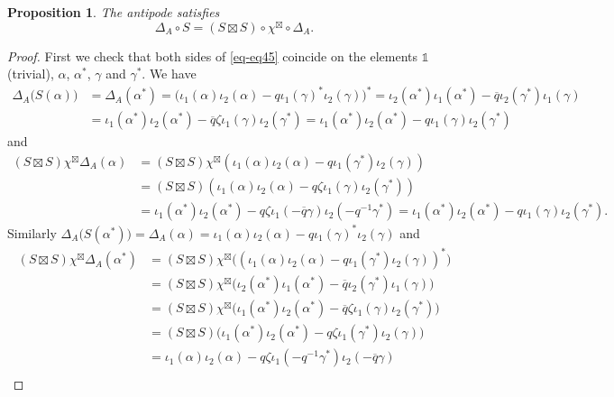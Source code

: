 \documentclass[12pt,reqno,a4paper]{amsart}
\newtheorem{proposition}{Proposition}[section]
\theoremstyle{definition}
\newcommand{\comp}{\circ}
\newcommand{\I}{\mathds{1}}
\numberwithin{equation}{section}
\begin{document}
\begin{proposition}\label{prop-lemma12}
The antipode satisfies
\begin{equation}\label{eq-eq45}
\Delta_A\comp S=(S\boxtimes S)\comp\chi^{\boxtimes}\comp\Delta_A.
\end{equation}
\end{proposition}

\begin{proof}
First we check that both sides of \eqref{eq-eq45} coincide on the elements $\I$ (trivial), $\alpha$, $\alpha^*$, $\gamma$ and $\gamma^*$. We have
\begin{align*}
\Delta_A\bigl(S(\alpha)\bigr)
&=\Delta_A(\alpha^*)
=\bigl(\iota_1(\alpha)\iota_2(\alpha)-q\iota_1(\gamma)^* \iota_2(\gamma)\bigr)^*
=\iota_2(\alpha^*)\iota_1(\alpha^*)-\overline{q}\iota_2(\gamma^*)\iota_1(\gamma)\\
&=\iota_1(\alpha^*)\iota_2(\alpha^*)-\overline{q}\zeta\iota_1(\gamma)\iota_2(\gamma^*)
=\iota_1(\alpha^*)\iota_2(\alpha^*)-q\iota_1(\gamma)\iota_2(\gamma^*)
\end{align*}
and
\begin{align*}
(S\boxtimes S)\chi^{\boxtimes}\Delta_A(\alpha)
&=(S\boxtimes S)\chi^{\boxtimes}(\iota_1(\alpha)\iota_2(\alpha)-q\iota_1(\gamma^*)\iota_2(\gamma))\\
&=(S\boxtimes S)(\iota_1(\alpha)\iota_2(\alpha)-q\zeta\iota_1(\gamma)\iota_2(\gamma^*))\\
&=\iota_1(\alpha^*)\iota_2(\alpha^*)-q\zeta\iota_1(-\overline{q}\gamma)\iota_2(-q^{-1}\gamma^*)
=\iota_1(\alpha^*)\iota_2(\alpha^*)-q\iota_1(\gamma)\iota_2(\gamma^*).
\end{align*}
Similarly $\Delta_A\bigl(S(\alpha^*)\bigr)
=\Delta_A(\alpha)
=\iota_1(\alpha)\iota_2(\alpha)-q\iota_1(\gamma)^*\iota_2(\gamma)$ and
\begin{align*}
(S\boxtimes S)\chi^{\boxtimes}\Delta_A(\alpha^*)
&=(S\boxtimes S)\chi^{\boxtimes}\bigl((\iota_1(\alpha)\iota_2(\alpha)-q\iota_1(\gamma^*)\iota_2(\gamma))^*\bigr)\\
&=(S\boxtimes S)\chi^{\boxtimes}\bigl(\iota_2(\alpha^*)\iota_1(\alpha^*)-\overline{q}\iota_2(\gamma^*)\iota_1(\gamma)\bigr)\\
&=(S\boxtimes S)\chi^{\boxtimes}\bigl(\iota_1(\alpha^*)\iota_2(\alpha^*)-\overline{q}\zeta\iota_1(\gamma)\iota_2(\gamma^*)\bigr)\\
&=(S\boxtimes S)\bigl(\iota_1(\alpha^*)\iota_2(\alpha^*)-q\zeta\iota_1(\gamma^*)\iota_2(\gamma)\bigr)\\
&=\iota_1(\alpha)\iota_2(\alpha)-q\zeta\iota_1(-q^{-1}\gamma^*)\iota_2(-\overline{q}\gamma)\\

\end{align*}
\end{proof}
\end{document}
